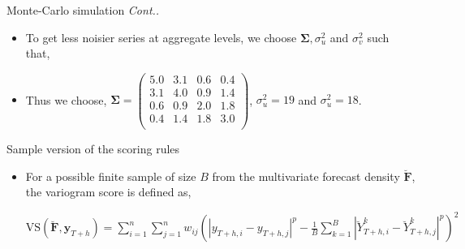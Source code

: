 \documentclass[11pt,xcolor=dvipsnames,handout]{beamer} %
\begin{document}
\begin{frame}[noframenumbering]{Monte-Carlo simulation \textit{Cont..}}
\begin{itemize}[<+-| alert@+>]
\item To get less noisier series at aggregate levels, we choose $\bm{\Sigma}, \sigma^2_u$ and $\sigma^2_v$ such that,
\begin{table}
	\small
	\centering %
\end{table}

\item Thus we choose,
$\bm{\Sigma} =
\begin{pmatrix}
5.0 & 3.1 & 0.6 & 0.4 \\
3.1 & 4.0 & 0.9 & 1.4 \\
0.6 & 0.9 & 2.0 & 1.8 \\
0.4 & 1.4 & 1.8 & 3.0 \\
\end{pmatrix}$,
$\sigma^2_u = 19$ and $\sigma^2_u = 18$.


\end{itemize} 
\end{frame}
%

\begin{frame}[noframenumbering]{Sample version of the scoring rules}
\begin{itemize}[<+-| alert@+>]
	
	\item For a possible finite sample of size $B$ from the multivariate forecast density $\breve{\bm{F}}$, the variogram score is defined as,
	\begin{table}
	\small
	$\text{VS}(\breve{\bm{F}}, \bm{y}_{T+h}) = \displaystyle\sum_{i=1}^{n}\displaystyle\sum_{j=1}^{n}w_{ij}\left(|y_{T+h,i} - y_{T+h,j}|^p - \frac{1}{B} \displaystyle\sum_{k=1}^{B} |\breve{Y}^k_{T+h,i}-\breve{Y}^k_{T+h,j}|^p\right)^2$
	\end{table}
		
	
\end{itemize} 
\end{frame}
%
\end{document}
